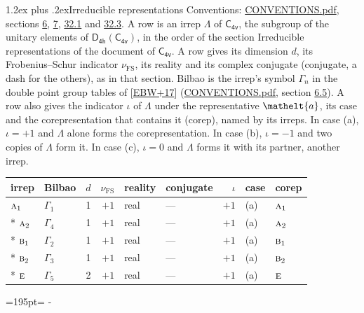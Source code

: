 \documentclass[10pt,a4paper]{article}
\makeatletter
\renewcommand\section{\@startsection{section}{1}{\z@}{-3ex plus -1ex minus -.2ex}%
  {1.2ex plus .2ex}{\normalfont\large\sffamily\bfseries\color{parttitle}}}
\newcommand{\needspace}[1]{\par\penalty-100\begingroup\dimen0=#1\relax\dimen2=\pagegoal
  \advance\dimen2-\pagetotal\ifdim\dimen0>\dimen2\relax\ifdim\dimen2>0pt\vfil\break\fi\fi
  \endgroup}
\numberwithin{equation}{section}
\newcommand{\eltfont}[1]{{\let\sigma\eltsigma\mathelt{#1}}}
\newcommand{\grp}[1]{\mathsf{#1}}
\newcommand{\irr}[1]{\text{\normalfont\scshape #1}}
\newcommand{\elt}[1]{\eltfont{#1}}
\newcommand{\fsind}{\nu_{\mathrm{FS}}}
\makeatother
\begin{document}
\section{Irreducible representations}\label{s:irreps}
Conventions: \href{../../CONVENTIONS.pdf}{CONVENTIONS.pdf}, sections \href{../../../rotation/CONVENTIONS.pdf\#conv.6}{6}, \href{../../../rotation/CONVENTIONS.pdf\#conv.7}{7}, \href{../../CONVENTIONS.pdf\#conv.32.1}{32.1} and \href{../../CONVENTIONS.pdf\#conv.32.3}{32.3}.
\leavevmode\label{n:irrep.Delta}A row is an irrep $\Lambda$ of $\grp{C_{4v}}$, the subgroup of the unitary elements of $\grp{D_{4h}}(\grp{C_{4v}})$, in the order of the section Irreducible representations of the document of \href{../../../rotation/data/pdf/C4v.pdf}{$\grp{C_{4v}}$}. \label{n:index.dimension}\label{n:index.frobenius}\label{n:head.irrep}\label{n:head.reality}\label{n:head.conjugate}A row gives its dimension $d$, its Frobenius--Schur indicator $\fsind$, its reality and its complex conjugate (conjugate, a dash for the others), as in that section. \label{n:head.bilbao}\label{n:irrep.alias.gamma}Bilbao is the irrep's symbol $\Gamma_n$ in the double point group tables of [\href{../../../REFERENCES.pdf\#ref.EBW+17}{EBW+17}] (\href{../../CONVENTIONS.pdf}{CONVENTIONS.pdf}, section \href{../../../rotation/CONVENTIONS.pdf\#conv.6.5}{6.5}). \label{n:head.case.corep}\label{n:head.corep}A row also gives the indicator $\iota$ of $\Lambda$ under the representative $\elt{a}$, its case and the corepresentation that contains it (corep), named by its irreps. In case (a), $\iota = +1$ and $\Lambda$ alone forms the corepresentation. In case (b), $\iota = -1$ and two copies of $\Lambda$ form it. In case (c), $\iota = 0$ and $\Lambda$ forms it with its partner, another irrep.
\setlength{\emergencystretch}{2em}\par\setlength{\emergencystretch}{0pt}
{\small\renewcommand{\arraystretch}{1.25}\setlength{\tabcolsep}{4pt}\begin{longtable}{@{}llrrllrll@{}}\toprule
irrep & Bilbao & $d$ & $\fsind$ & reality & conjugate & $\iota$ & case & corep\\\midrule\endhead
\bottomrule\endfoot\endlastfoot
$\irr{a}_{1}$ & $\Gamma_{1}$ & 1 & $+1$ & real & --- & $+1$ & (a) & $\irr{a}_{1}$\\*
$\irr{a}_{2}$ & $\Gamma_{4}$ & 1 & $+1$ & real & --- & $+1$ & (a) & $\irr{a}_{2}$\\*
$\irr{b}_{1}$ & $\Gamma_{2}$ & 1 & $+1$ & real & --- & $+1$ & (a) & $\irr{b}_{1}$\\*
$\irr{b}_{2}$ & $\Gamma_{3}$ & 1 & $+1$ & real & --- & $+1$ & (a) & $\irr{b}_{2}$\\*
$\irr{e}$ & $\Gamma_{5}$ & 2 & $+1$ & real & --- & $+1$ & (a) & $\irr{e}$\\
\bottomrule\end{longtable}}
\needspace{195pt}
\end{document}
